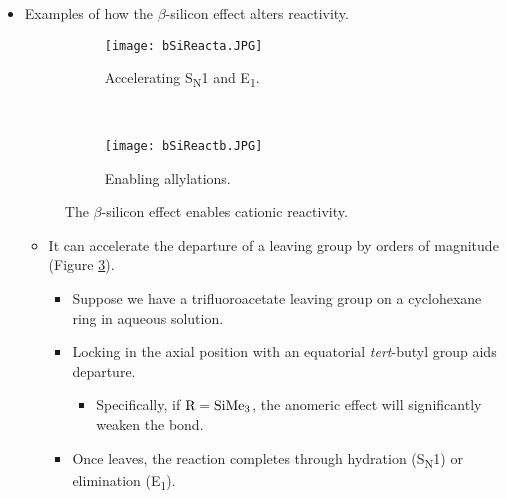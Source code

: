 \documentclass[../notes.tex]{subfiles}
\begin{document}
\begin{itemize}
\begin{figure}[h!]
\begin{subfigure}[b]{0.25\linewidth}
            \label{fig:HIAbSib}
        \end{subfigure}
        \caption{Hydride ion affinities subject to the $\beta$-silicon effect.}
        \label{fig:HIAbSi}
    \end{figure}
    \begin{itemize}
        \item Changing an alkyl cation to the direct silicon analogue alters the HIA by nearly \SI[per-mode=symbol]{40}{\kilo\calorie\per\mole}.
    \end{itemize}
    \item Examples of how the $\beta$-silicon effect alters reactivity.
    \begin{figure}[h!]
        \centering
        \begin{subfigure}[b]{\linewidth}
            \centering
            \texttt{[image: bSiReacta.JPG]}
            \caption{Accelerating S\textsubscript{N}1 and E\textsubscript{1}.}
            \label{fig:bSiReacta}
        \end{subfigure}\\[2em]
        \begin{subfigure}[b]{\linewidth}
            \centering
            \texttt{[image: bSiReactb.JPG]}
            \caption{Enabling allylations.}
            \label{fig:bSiReactb}
        \end{subfigure}
        \caption{The $\beta$-silicon effect enables cationic reactivity.}
        \label{fig:bSiReact}
    \end{figure}
    \begin{itemize}
        \item It can accelerate the departure of a leaving group by orders of magnitude (Figure \ref{fig:bSiReacta}).
        \begin{itemize}
            \item Suppose we have a trifluoroacetate leaving group on a cyclohexane ring in aqueous solution.
            \item Locking  in the axial position with an equatorial \emph{tert}-butyl group aids departure.
            \begin{itemize}
                \item Specifically, if $\ce{R}=\ce{SiMe3}$, the anomeric effect will significantly weaken the  bond.
            \end{itemize}
            \item Once  leaves, the reaction completes through hydration (S\textsubscript{N}1) or elimination (E\textsubscript{1}).

\end{itemize}
\end{itemize}
\end{itemize}
\end{document}
